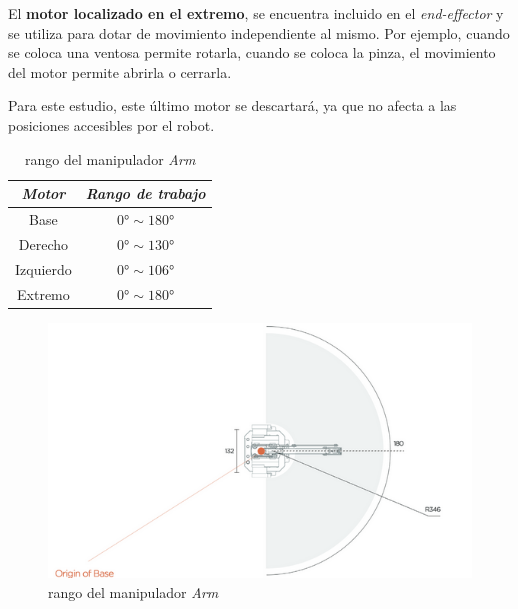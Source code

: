 \documentclass[a4paper,12pt]{article}
\begin{document}
El \textbf{motor localizado en el extremo}, se encuentra incluido en el \textit{end-effector} 
y se utiliza para dotar de movimiento independiente al mismo. Por ejemplo, cuando se coloca 
una ventosa permite rotarla, cuando se coloca la pinza, el movimiento del motor permite 
abrirla o cerrarla.

Para este estudio, este último motor se descartará, ya que no afecta a las
posiciones accesibles por el robot.

\begin{table}[ht]
    \begin{minipage}{.49\linewidth}
        \centering
        \begin{tabular}{||c | c||}
            \hline
            \textit{Motor} & \textit{Rango de trabajo} \\ [0.5ex]
            \hline\hline
            Base           & $\ang{0} \sim \ang{180}$  \\
            \hline
            Derecho        & $\ang{0} \sim \ang{130}$  \\
            \hline
            Izquierdo      & $\ang{0} \sim \ang{106}$  \\
            \hline
            Extremo        & $\ang{0} \sim \ang{180}$  \\ [1ex]
            \hline
        \end{tabular}
        \caption{ángulo de giro de los motores \cite{noauthor_uarm-swift-specifications-171012.pdf_2019}}
        \label{tab:motors}
    \end{minipage}
    \hfill
    \begin{minipage}{.49\linewidth}
        \begin{figure}[H]
            \centering
            \includegraphics[width=\linewidth]{images/range.png}
            \caption{rango del manipulador \emph{{\textmu}Arm} \cite{noauthor_uarm_2019}}
            \label{fig:range}
        \end{figure}
    \end{minipage}
\end{table}
\end{document}
